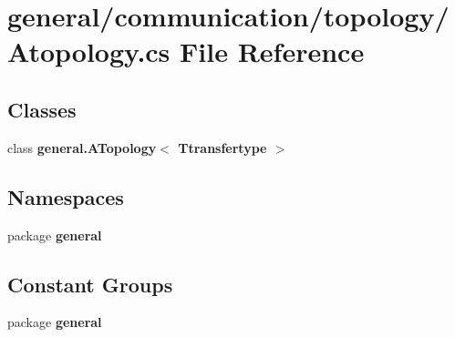 \section{general/communication/topology/\-Atopology.cs File Reference}
\label{_atopology_8cs}
\subsection*{Classes}
\begin{DoxyCompactItemize}
\item 
class {\bf general.\-A\-Topology$<$ Ttransfertype $>$}
\end{DoxyCompactItemize}
\subsection*{Namespaces}
\begin{DoxyCompactItemize}
\item 
package {\bf general}
\end{DoxyCompactItemize}
\subsection*{Constant Groups}
\begin{DoxyCompactItemize}
\item 
package {\bf general}
\end{DoxyCompactItemize}
